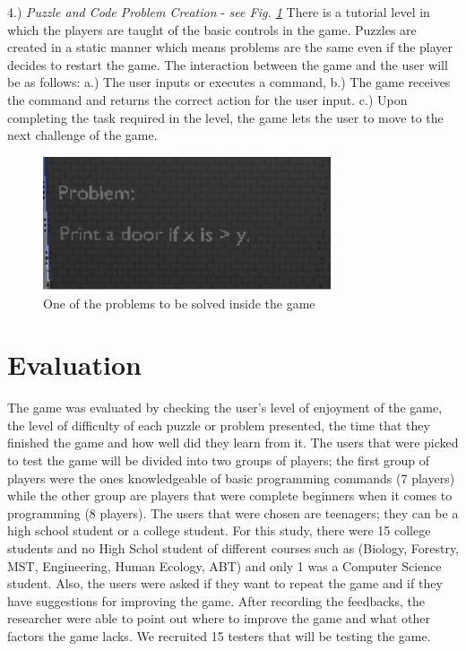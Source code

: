 \documentclass[journal]{./IEEE/IEEEtran}
\begin{document}
\begin{justify}
4.)	\textit{Puzzle and Code Problem Creation} - \textit{see Fig. \ref{problem}} There is a tutorial level in which the players are taught of the basic controls in the game. Puzzles are created in a static manner which means problems are the same even if the player decides to restart the game. 
The interaction between the game and the user will be as follows:\newline
a.)	The user inputs or executes a command,\newline
b.)	The game receives the command and returns the correct action for the user input.\newline
c.)	Upon completing the task required in the level, the game lets the user to move to the next challenge of the game. \newline

\begin{figure}[ht]
   \includegraphics[width = 8.5cm]{images/problem}
   \caption{One of the problems to be solved inside the game}
   \label{problem}
\end{figure}

\section{\textbf{Evaluation}}

The game was evaluated by checking the user’s level of enjoyment of the game, the level of difficulty of each puzzle or problem presented, the time that they finished the game and how well did they learn from it. The users that were picked to test the game will be divided into two groups of players; the first group of players were the ones knowledgeable of basic programming commands (7 players) while the other group are players that were complete beginners when it comes to programming (8 players). The users that were chosen are teenagers; they can be a high school student or a college student. For this study, there were 15 college students and no High Schol student of different courses such as (Biology, Forestry, MST, Engineering, Human Ecology, ABT) and only 1 was a Computer Science student. Also, the users were asked if they want to repeat the game and if they have suggestions for improving the game. After recording the feedbacks, the researcher were able to point out where to improve the game and what other factors the game lacks. We recruited 15 testers that will be testing the game.


\end{justify}
\end{document}

